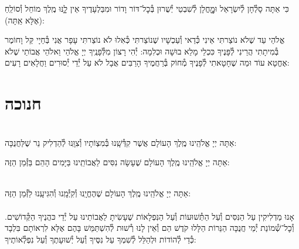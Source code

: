 \documentclass[twoside, openany, parskip=half, 11pt]{book}
\begin{document}
כִּי אַתָּה סָלְ֯חָן לְ֯יִשְׂרָאֵל וּמׇׇׇׇחֳלָן לְ֯שִׁבְטֵי יְ֯שֻׁרוּן בְּ֯כׇל־דּוֹר וָדוֹר
וּמִבַּלְעָדֶיךָ אֵין לׇׇֽנּוּ מֶֽלֶךְ מוֹחֵל וְ֯סוֹלֵֽחַ (אֶלָּא אַֽתָּה):

אֱלֹהַי עַד שֶׁלֹא נוֹצַרתִּי אֵינִי כְּ֯דַאי וְ֯עַכְשָׁיו שֶׁנוֹצַרתִּי כְּ֯אִלוּ לֹא נוֹצַרתִּי עָפָר אֲנִי בְּ֯חַיָי קַּל וָחוֹמֶר בְּ֯מִיתָתִי הֲרֵינִי לְ֯פָּנֶיךָ כִּכְלֵי מָלֵא בוּשָׁה וּכְלִמָה: יְ֯הִי רָצוֹן מִלְּ֯פָנֶֽיךָ יְיָ אֱלֹהַי וֵאלֹהֵי אֲבוֹתַי שֶׁלֹא אֶחֱטָא עוֹד וּמַה שֶׁחָטָאתִי לְ֯פָנֶיךָ מְ֯חוֹק בְּ֯רַחֲמֶיךָ הָרַבִּים אֲבָל לֹא עַל יְ֯דֵי יְ֯סוּרִים וַחֲלָאִים רָעִים:

\vfill
\sepline

\chapter[חנוכה]{ חנוכה }
\label{chanukah}

\\
אַתָּה יְיָ אֱלֹהֵֽינוּ מֶֽלֶךְ הָעוֹלָם
אֲשֶׁר קִדְּ֯שָֽׁנוּ בְּ֯מִצְוֹתָיו וְ֯צִוָּֽנוּ לְ֯הַדְלִיק נֵר שֶׁלַּחֲנֻכָּה:

אַתָּה יְיָ אֱלֹהֵֽינוּ מֶֽלֶךְ הָעוֹלָם שֶׁעָשָׂה נִסִּים לַאֲבוֹתֵֽינוּ בַּיָּמִים הָהֵם בַּזְּ֯מַן הַזֶּה:

\\
אַתָּה יְיָ אֱלֹהֵֽינוּ מֶֽלֶךְ הָעוֹלָם שֶׁהֶחֱיָֽנוּ וְ֯קִיְּ֯מָֽנוּ וְ֯הִגִּיעָֽנוּ לַזְּ֯מַן הַזֶּה:\\

\\
אָנוּ מַדְלִיקִין
עַל הַנִּסִּים וְ֯עַל הַתְּ֯שׁוּעוֹת
וְ֯עַל הַנִּפְלָאוֹת
שֶׁעָשִׂיתָ לַאֲבוֹתֵינוּ
עַל יְ֯דֵי כּהֲנֶיךָ הַקְּ֯דוֹשִׁים.
וְ֯כׇל־שְׁ֯מוֹנַת יְ֯מֵי חֲנֻכָּה
הַנֵּרוֹת הַלָּלוּ קֹדֶשׁ הֵם
וְ֯אֵין לָנוּ רְ֯שׁוּת לְ֯הִשְׁתַּמֵּשׁ בָּהֶם
אֶלָּא לִרְאוֹתָם בִּלְבָד
כְּ֯דֵי לְ֯הוֹדוֹת וּלְהַלֵּל לְ֯שִׁמְךָ
עַל נִסֶּיךָ וְ֯עַל יְ֯שׁוּעָתֶךָ
וְ֯עַל נִפְלְ֯אוֹתֶיךָ:
\end{document}
